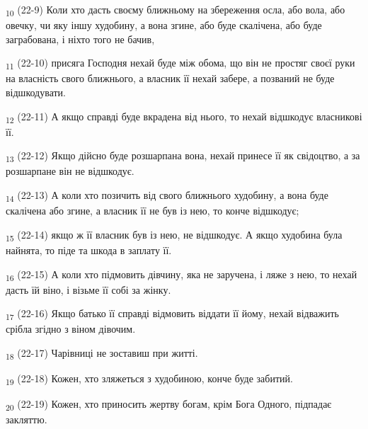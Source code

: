 \begin{tcolorbox}
\textsubscript{10} (22-9) Коли хто дасть своєму ближньому на збереження осла, або вола, або овечку, чи яку іншу худобину, а вона згине, або буде скалічена, або буде заграбована, і ніхто того не бачив,
\end{tcolorbox}
\begin{tcolorbox}
\textsubscript{11} (22-10) присяга Господня нехай буде між обома, що він не простяг своєї руки на власність свого ближнього, а власник її нехай забере, а позваний не буде відшкодувати.
\end{tcolorbox}
\begin{tcolorbox}
\textsubscript{12} (22-11) А якщо справді буде вкрадена від нього, то нехай відшкодує власникові її.
\end{tcolorbox}
\begin{tcolorbox}
\textsubscript{13} (22-12) Якщо дійсно буде розшарпана вона, нехай принесе її як свідоцтво, а за розшарпане він не відшкодує.
\end{tcolorbox}
\begin{tcolorbox}
\textsubscript{14} (22-13) А коли хто позичить від свого ближнього худобину, а вона буде скалічена або згине, а власник її не був із нею, то конче відшкодує;
\end{tcolorbox}
\begin{tcolorbox}
\textsubscript{15} (22-14) якщо ж її власник був із нею, не відшкодує. А якщо худобина була найнята, то піде та шкода в заплату її.
\end{tcolorbox}
\begin{tcolorbox}
\textsubscript{16} (22-15) А коли хто підмовить дівчину, яка не заручена, і ляже з нею, то нехай дасть їй віно, і візьме її собі за жінку.
\end{tcolorbox}
\begin{tcolorbox}
\textsubscript{17} (22-16) Якщо батько її справді відмовить віддати її йому, нехай відважить срібла згідно з віном дівочим.
\end{tcolorbox}
\begin{tcolorbox}
\textsubscript{18} (22-17) Чарівниці не зоставиш при житті.
\end{tcolorbox}
\begin{tcolorbox}
\textsubscript{19} (22-18) Кожен, хто зляжеться з худобиною, конче буде забитий.
\end{tcolorbox}
\begin{tcolorbox}
\textsubscript{20} (22-19) Кожен, хто приносить жертву богам, крім Бога Одного, підпадає закляттю.
\end{tcolorbox}
